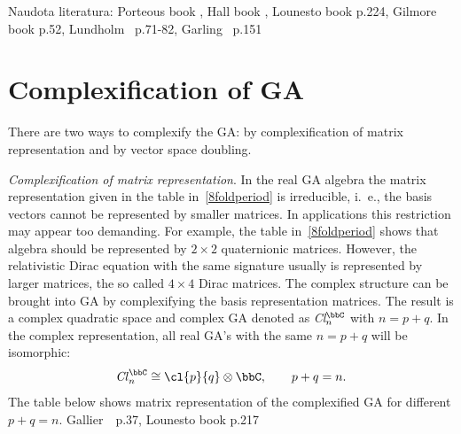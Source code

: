 Naudota literatura: Porteous book \cite{Porteous95}, Hall book
\cite{Hall03}, Lounesto book \cite{Lounesto97} p.224, Gilmore book
\cite{Gilmore74} p.52, Lundholm~\cite{Lundholm09}  p.71-82,
Garling~\cite{Garling11} p.151





\section{Complexification of GA}
There are two ways to complexify the GA: by complexification of
matrix representation and by vector space doubling.
\begin{unit}\textit{Complexification of matrix representation}.
\label{complexification}
In the real GA algebra the matrix representation given in the
table in~\ref{8foldperiod} is irreducible, i.~e.,  the basis
vectors cannot be represented by smaller matrices. In applications
this restriction may appear too demanding. For example, the table
in~\ref{8foldperiod} shows that  algebra  should be
represented by $2\times 2$ quaternionic matrices. However, the
relativistic Dirac equation with the same signature usually is
represented by larger matrices, the so called  $4\times 4$ Dirac
matrices.  The complex structure can be brought into GA by
complexifying the basis representation matrices. The result is a
complex quadratic space and complex GA denoted as
\textit{Cl}$_{n}^{\bbC}$ with $n=p+q$. In the complex
representation, all real GA's with the same $n=p+q$ will be
isomorphic:
\[\mathit{Cl}_{n}^{\bbC}\cong\cl{p}{q}\otimes\bbC,\qquad p+q=n.\]
The table below shows matrix representation  of the complexified
GA for different $p+q=n$.  Gallier~\cite{Gallier08}~p.37, Lounesto
book p.217


\end{unit}
